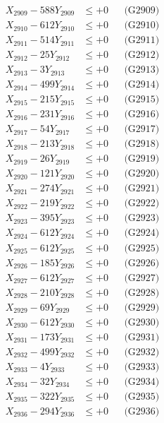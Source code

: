 \documentclass[a4paper,10pt]{article}
\begin{document}
{\begin{align}
X_{2909} - 588Y_{2909} &\leq +0 && \text{(G2909)} \\
X_{2910} - 612Y_{2910} &\leq +0 && \text{(G2910)} \\
\allowbreak
X_{2911} - 514Y_{2911} &\leq +0 && \text{(G2911)} \\
X_{2912} - 25Y_{2912} &\leq +0 && \text{(G2912)} \\
X_{2913} - 3Y_{2913} &\leq +0 && \text{(G2913)} \\
X_{2914} - 499Y_{2914} &\leq +0 && \text{(G2914)} \\
X_{2915} - 215Y_{2915} &\leq +0 && \text{(G2915)} \\
X_{2916} - 231Y_{2916} &\leq +0 && \text{(G2916)} \\
X_{2917} - 54Y_{2917} &\leq +0 && \text{(G2917)} \\
X_{2918} - 213Y_{2918} &\leq +0 && \text{(G2918)} \\
X_{2919} - 26Y_{2919} &\leq +0 && \text{(G2919)} \\
X_{2920} - 121Y_{2920} &\leq +0 && \text{(G2920)} \\
\allowbreak
X_{2921} - 274Y_{2921} &\leq +0 && \text{(G2921)} \\
X_{2922} - 219Y_{2922} &\leq +0 && \text{(G2922)} \\
X_{2923} - 395Y_{2923} &\leq +0 && \text{(G2923)} \\
X_{2924} - 612Y_{2924} &\leq +0 && \text{(G2924)} \\
X_{2925} - 612Y_{2925} &\leq +0 && \text{(G2925)} \\
X_{2926} - 185Y_{2926} &\leq +0 && \text{(G2926)} \\
X_{2927} - 612Y_{2927} &\leq +0 && \text{(G2927)} \\
X_{2928} - 210Y_{2928} &\leq +0 && \text{(G2928)} \\
X_{2929} - 69Y_{2929} &\leq +0 && \text{(G2929)} \\
X_{2930} - 612Y_{2930} &\leq +0 && \text{(G2930)} \\
\allowbreak
X_{2931} - 173Y_{2931} &\leq +0 && \text{(G2931)} \\
X_{2932} - 499Y_{2932} &\leq +0 && \text{(G2932)} \\
X_{2933} - 4Y_{2933} &\leq +0 && \text{(G2933)} \\
X_{2934} - 32Y_{2934} &\leq +0 && \text{(G2934)} \\
X_{2935} - 322Y_{2935} &\leq +0 && \text{(G2935)} \\
X_{2936} - 294Y_{2936} &\leq +0 && \text{(G2936)} \\

\end{align}}
\end{document}
